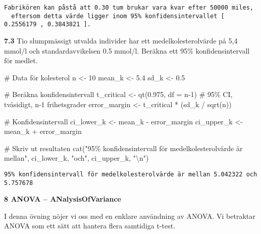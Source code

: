 \documentclass[
  letterpaper,
  DIV=11,
  numbers=noendperiod]{scrartcl}
\newenvironment{Shaded}{\begin{snugshade}}{\end{snugshade}}
\newcommand{\AttributeTok}[1]{\textcolor[rgb]{0.40,0.45,0.13}{#1}}
\newcommand{\CommentTok}[1]{\textcolor[rgb]{0.37,0.37,0.37}{#1}}
\newcommand{\DecValTok}[1]{\textcolor[rgb]{0.68,0.00,0.00}{#1}}
\newcommand{\FloatTok}[1]{\textcolor[rgb]{0.68,0.00,0.00}{#1}}
\newcommand{\FunctionTok}[1]{\textcolor[rgb]{0.28,0.35,0.67}{#1}}
\newcommand{\NormalTok}[1]{\textcolor[rgb]{0.00,0.23,0.31}{#1}}
\newcommand{\OtherTok}[1]{\textcolor[rgb]{0.00,0.23,0.31}{#1}}
\newcommand{\SpecialCharTok}[1]{\textcolor[rgb]{0.37,0.37,0.37}{#1}}
\newcommand{\StringTok}[1]{\textcolor[rgb]{0.13,0.47,0.30}{#1}}
\begin{document}
\begin{verbatim}
Fabrikören kan påstå att 0.30 tum brukar vara kvar efter 50000 miles,
  eftersom detta värde ligger inom 95% konfidensintervallet [ 0.2556179 , 0.3843821 ].
\end{verbatim}

\textbf{7.3} Tio slumpmässigt utvalda individer har ett
medelkolesterolvärde på 5,4 mmol/l och standardavvikelsen 0.5 mmol/l.
Beräkna ett 95\% konfidensintervall för medlet.

\begin{Shaded}
\begin{Highlighting}[]
\CommentTok{\# Data för kolesterol}
\NormalTok{n }\OtherTok{\textless{}{-}} \DecValTok{10}
\NormalTok{mean\_k }\OtherTok{\textless{}{-}} \FloatTok{5.4}
\NormalTok{sd\_k }\OtherTok{\textless{}{-}} \FloatTok{0.5}

\CommentTok{\# Beräkna konfidensintervall}
\NormalTok{t\_critical }\OtherTok{\textless{}{-}} \FunctionTok{qt}\NormalTok{(}\FloatTok{0.975}\NormalTok{, }\AttributeTok{df =}\NormalTok{ n}\DecValTok{{-}1}\NormalTok{) }\CommentTok{\# 95\% CI, tvåsidigt, n{-}1 frihetsgrader}
\NormalTok{error\_margin }\OtherTok{\textless{}{-}}\NormalTok{ t\_critical }\SpecialCharTok{*}\NormalTok{ (sd\_k }\SpecialCharTok{/} \FunctionTok{sqrt}\NormalTok{(n))}

\CommentTok{\# Konfidensintervall}
\NormalTok{ci\_lower\_k }\OtherTok{\textless{}{-}}\NormalTok{ mean\_k }\SpecialCharTok{{-}}\NormalTok{ error\_margin}
\NormalTok{ci\_upper\_k }\OtherTok{\textless{}{-}}\NormalTok{ mean\_k }\SpecialCharTok{+}\NormalTok{ error\_margin}

\CommentTok{\# Skriv ut resultaten}
\FunctionTok{cat}\NormalTok{(}\StringTok{"95\% konfidensintervall för medelkolesterolvärde är mellan"}\NormalTok{,}
\NormalTok{ci\_lower\_k, }\StringTok{"och"}\NormalTok{, ci\_upper\_k, }\StringTok{"}\SpecialCharTok{\textbackslash{}n}\StringTok{"}\NormalTok{)}
\end{Highlighting}
\end{Shaded}

\begin{verbatim}
95% konfidensintervall för medelkolesterolvärde är mellan 5.042322 och 5.757678 
\end{verbatim}

\textbf{8 ANOVA -- ANalysisOfVariance}

I denna övning nöjer vi oss med en enklare användning av ANOVA. Vi
betraktar ANOVA som ett sätt att hantera flera samtidiga t-test.
\end{document}
